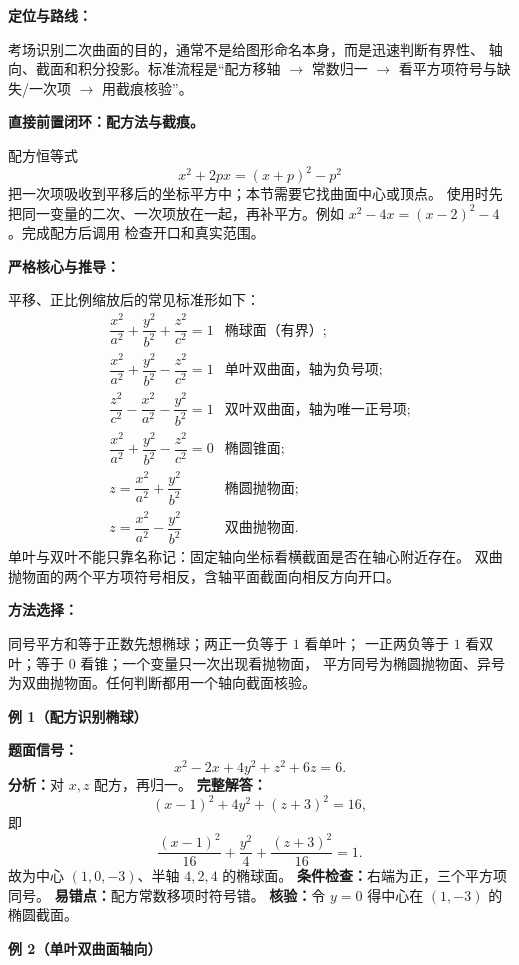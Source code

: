 \begin{knowledgeBox}
\textbf{定位与路线：}

考场识别二次曲面的目的，通常不是给图形命名本身，而是迅速判断有界性、
轴向、截面和积分投影。标准流程是“配方移轴 \(\to\) 常数归一
\(\to\) 看平方项符号与缺失/一次项 \(\to\) 用截痕核验”。

\textbf{直接前置闭环：配方法与截痕。}

配方恒等式
\[
x^2+2px=(x+p)^2-p^2
\]
把一次项吸收到平移后的坐标平方中；本节需要它找曲面中心或顶点。
使用时先把同一变量的二次、一次项放在一起，再补平方。例如
\(x^2-4x=(x-2)^2-4\)。完成配方后调用
检查开口和真实范围。

\textbf{严格核心与推导：}

平移、正比例缩放后的常见标准形如下：
\[
\begin{array}{ll}
\dfrac{x^2}{a^2}+\dfrac{y^2}{b^2}+\dfrac{z^2}{c^2}=1
&\text{椭球面（有界）};\\[4pt]
\dfrac{x^2}{a^2}+\dfrac{y^2}{b^2}-\dfrac{z^2}{c^2}=1
&\text{单叶双曲面，轴为负号项};\\[4pt]
\dfrac{z^2}{c^2}-\dfrac{x^2}{a^2}-\dfrac{y^2}{b^2}=1
&\text{双叶双曲面，轴为唯一正号项};\\[4pt]
\dfrac{x^2}{a^2}+\dfrac{y^2}{b^2}-\dfrac{z^2}{c^2}=0
&\text{椭圆锥面};\\[4pt]
z=\dfrac{x^2}{a^2}+\dfrac{y^2}{b^2}
&\text{椭圆抛物面};\\[4pt]
z=\dfrac{x^2}{a^2}-\dfrac{y^2}{b^2}
&\text{双曲抛物面}.
\end{array}
\]
单叶与双叶不能只靠名称记：固定轴向坐标看横截面是否在轴心附近存在。
双曲抛物面的两个平方项符号相反，含轴平面截面向相反方向开口。

\textbf{方法选择：}

同号平方和等于正数先想椭球；两正一负等于 \(1\) 看单叶；
一正两负等于 \(1\) 看双叶；等于 \(0\) 看锥；一个变量只一次出现看抛物面，
平方同号为椭圆抛物面、异号为双曲抛物面。任何判断都用一个轴向截面核验。

\textbf{例 1（配方识别椭球）}

\textbf{题面信号：}
\[
x^2-2x+4y^2+z^2+6z=6.
\]
\textbf{分析：}对 \(x,z\) 配方，再归一。
\textbf{完整解答：}
\[
(x-1)^2+4y^2+(z+3)^2=16,
\]
即
\[
\frac{(x-1)^2}{16}+\frac{y^2}{4}
+\frac{(z+3)^2}{16}=1.
\]
故为中心 \((1,0,-3)\)、半轴 \(4,2,4\) 的椭球面。
\textbf{条件检查：}右端为正，三个平方项同号。
\textbf{易错点：}配方常数移项时符号错。
\textbf{核验：}令 \(y=0\) 得中心在 \((1,-3)\) 的椭圆截面。

\textbf{例 2（单叶双曲面轴向）}


\end{knowledgeBox}
